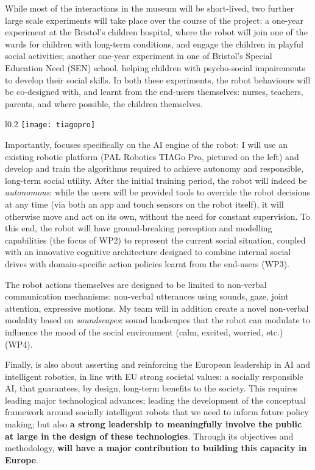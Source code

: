 While most of the interactions in the museum will be short-lived, two further
large scale experiments will take place over the course of the project: a
one-year experiment at the Bristol's children hospital, where the robot will
join one of the wards for children with long-term conditions, and engage the
children in playful social activities; another one-year experiment in one of
Bristol's Special Education Need (SEN) school, helping children with
psycho-social impairements to develop their social skills. In both these
experiments, the robot behaviours will be co-designed with, and learnt from the
end-users themselves: nurses, teachers, parents, and where possible, the
children themselves.


\begin{wrapfigure}{l}{0.2\linewidth}
    \centering
    \texttt{[image: tiagopro]}
    \label{fig|tiagopro}
\end{wrapfigure}

Importantly, \project focuses specifically on the AI engine of the robot: I will
use an existing robotic platform (PAL Robotics TIAGo Pro, pictured on the left) and develop and train the
algorithms required to achieve autonomy and responsible, long-term social utility. After the
initial training period, the robot will indeed be \emph{autonomous}: while the
users will be provided tools to override the robot decisions at any time (via
both an app and touch sensors on the robot itself), it will otherwise
move and act on its own, without the need for constant supervision. To this end,
the robot will have ground-breaking perception and modelling capabilities (the
focus of WP2) to represent the current social situation, coupled with an
innovative cognitive architecture designed to combine internal social
drives with domain-specific action policies learnt from the end-users (WP3).

The robot actions themselves are designed to be limited to non-verbal
communication mechanisms: non-verbal utterances using sounds, gaze, joint
attention, expressive motions. My team will in addition create a novel
non-verbal modality based on \emph{soundscapes}: sound landscapes that the robot
can modulate to influence the mood of the social environment (calm, excited,
worried, etc.) (WP4).

Finally, \project is also about asserting and reinforcing the European
leadership in AI and intelligent robotics, in line with EU strong societal
values: a socially responsible AI, that guarantees, by design, long-term
benefits to the society. This requires leading major technological advances;
leading the development of the conceptual framework around socially intelligent
robots that we need to inform future policy making; but also \textbf{a strong
leadership to meaningfully involve the public at large in the design of these
technologies}. Through its objectives and methodology, \textbf{\project will
have a major contribution to building this capacity in Europe}. 

